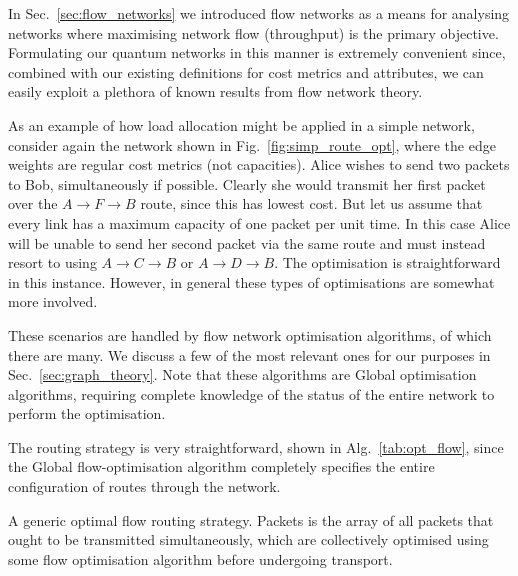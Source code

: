 \documentclass[aps,rmp,twocolumn,amsmath,amssymb,nofootinbib,superscriptaddress]{revtex4}
\begin{document}
In Sec.~\ref{sec:flow_networks} we introduced flow networks as a means for analysing networks where maximising network flow (throughput) is the primary objective. Formulating our quantum networks in this manner is extremely convenient since, combined with our existing definitions for cost metrics and attributes, we can easily exploit a plethora of known results from flow network theory.

As an example of how load allocation might be applied in a simple network, consider again the network shown in Fig.~\ref{fig:simp_route_opt}, where the edge weights are regular cost metrics (not capacities). Alice wishes to send two packets to Bob, simultaneously if possible. Clearly she would transmit her first packet over the \mbox{$A\to F\to B$} route, since this has lowest cost. But let us assume that every link has a maximum capacity of one packet per unit time. In this case Alice will be unable to send her second packet via the same route and must instead resort to using \mbox{$A\to C \to B$} or \mbox{$A\to D\to B$}. The optimisation is straightforward in this instance. However, in general these types of optimisations are somewhat more involved.

These scenarios are handled by flow network optimisation algorithms, of which there are many. We discuss a few of the most relevant ones for our purposes in Sec.~\ref{sec:graph_theory}. Note that these algorithms are {\sc Global} optimisation algorithms, requiring complete knowledge of the status of the entire network to perform the optimisation.

The routing strategy is very straightforward, shown in Alg.~\ref{tab:opt_flow}, since the {\sc Global} flow-optimisation algorithm completely specifies the entire configuration of routes through the network.

\begin{table}[!htb]
\caption{A generic optimal flow routing strategy. {\sc Packets} is the array of all packets that ought to be transmitted simultaneously, which are collectively optimised using some flow optimisation algorithm before undergoing transport.} \label{tab:opt_flow}
\end{table}
\end{document}
